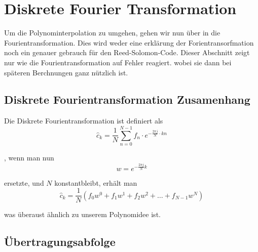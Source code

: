 %
%
%
\section{Diskrete Fourier Transformation
\label{reedsolomon:section:dtf}}
Um die Polynominterpolation zu umgehen, gehen wir nun über in die Fourientransformation.
Dies wird weder eine erklärung der Forientransorfmation noch ein genauer gebrauch
für den Reed-Solomon-Code. Dieser Abschnitt zeigt nur wie die Fourientransformation auf Fehler reagiert.
wobei sie dann bei späteren Berchnungen ganz nützlich ist.

\subsection{Diskrete Fourientransformation Zusamenhang
\label{reedsolomon:subsection:dtfzusamenhang}}
Die Diskrete Fourientransformation ist definiert als
\begin{equation}
	\hat{c}_{k} 
	= \frac{1}{N} \sum_{n=0}^{N-1}
	{f}_n \cdot e^{-\frac{2\pi j}{N} \cdot kn}
	\label{reedsolomon:DFT}
\end{equation}

, wenn man nun 
\begin{equation}
	w =
	e^{-\frac{2\pi j}{N} k}
	\label{reedsolomon:DFT_summand}
\end{equation}

ersetzte, und $N$ konstantbleibt, erhält man
\begin{equation}
	\hat{c}_{k}=
	\frac{1}{N}( {f}_0 w^0 + {f}_1 w^1 + {f}_2 w^2 + \dots + {f}_{N-1} w^N)
	\label{reedsolomon:DFT_polynom}
\end{equation}

was überaust ähnlich zu unserem Polynomidee ist.
\subsection{Übertragungsabfolge
\label{reedsolomon:subsection:Übertragungsabfolge}}

